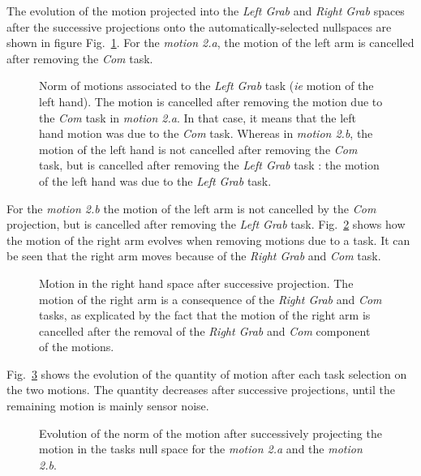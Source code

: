 \documentclass[letterpaper, 10pt, conference]{ieeeconf}      %
\begin{document}
The evolution of the motion projected into the \emph{Left Grab} and \emph{Right Grab}
spaces after the successive projections onto the automatically-selected nullspaces
are shown in figure Fig.~\ref{fig:exp1:Evolution2L}. For the \emph{motion 2.a},
the motion of the left arm is cancelled after removing the \emph{Com} task.
\begin{figure}[t]
  \centering
  \subfigure[Motion 2.a]{
  \resizebox{.48\textwidth}{!} {
  
  }                           
  \label{fig:exp1:Evolution2L:a}
  }
  \subfigure[Motion 2.b]{
  \resizebox{.48\textwidth}{!} {
  
  }
  \label{fig:exp1:Evolution2L:b}
  }
  \caption{Norm of motions associated to the \emph{Left Grab} task (\emph{ie} motion of the left hand).
  The motion is cancelled after removing the motion due to the \emph{Com} task
  in \emph{motion 2.a}. In that case, it means that the left hand motion was due to the \emph{Com} task.
  Whereas in \emph{motion 2.b}, the motion of the left hand is not cancelled after
  removing the \emph{Com} task, but is cancelled after removing
  the \emph{Left Grab} task : the motion of the left hand was due
  to the \emph{Left Grab} task.}
  \label{fig:exp1:Evolution2L}
\end{figure}
For the \emph{motion 2.b} the motion of the left arm is
not cancelled by the \emph{Com} projection, but is cancelled after
removing the \emph{Left Grab} task.
Fig.~\ref{fig:exp1:Evolution2R} shows how the motion of the right arm evolves when removing
motions due to a task. It can be seen that the right arm moves because of the \emph{Right Grab} and
\emph{Com} task.
\begin{figure}[t]
  \centering
  \subfigure[Motion 2.a]{
  \resizebox{.48\textwidth}{!} {
  
  }                           
  \label{fig:exp1:Evolution2R:a}
  }
  \subfigure[Motion 2.b]{
  \resizebox{.48\textwidth}{!} {
  
  }
  \label{fig:exp1:Evolution2R:b}
  }
  \caption{Motion in the right hand space after successive projection.
  The motion of the right arm is a consequence of the  
  \emph{Right Grab} and \emph{Com} tasks, as explicated by the fact
  that the motion of the right arm is cancelled
  after the removal of the \emph{Right Grab} and \emph{Com} component of the motions.}
  \label{fig:exp1:Evolution2R}
\end{figure}
Fig.~\ref{fig:exp1:PqdotNorms} shows the evolution of the quantity of motion after each task selection
on the two motions. The quantity decreases after successive projections, until the remaining motion 
is mainly sensor noise.
\begin{figure}[t]
  \centering
  \subfigure[Motion 2.a]{
  \resizebox{.48\textwidth}{!} {
    
  }
  \label{fig:exp1:PqdotNormsR}
  }
  \subfigure[Motion 2.b]{
  \resizebox{.48\textwidth}{!} {
    
  }
\label{fig:exp1:PqdotNormsRL}
}
\caption{Evolution of the norm of the motion after successively projecting the motion in the tasks null space for
the \emph{motion 2.a} and the \emph{motion 2.b}.}
\label{fig:exp1:PqdotNorms}
\end{figure}
\end{document}
